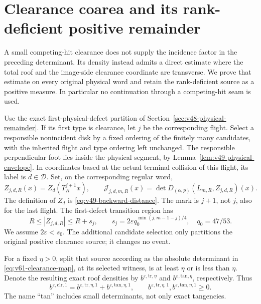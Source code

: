\section{Clearance coarea and its rank-deficient positive remainder}
\label{sec:v61-clearance-coarea}
A small competing-hit clearance does not supply the incidence factor
in the preceding determinant. Its density instead admits a direct
estimate where the total roof and the image-side clearance coordinate
are transverse. We prove that estimate on every original physical word
and retain the rank-deficient source as a positive measure. In
particular no continuation through a competing-hit seam is used.

Use the exact first-physical-defect partition of
Section~\ref{sec:v48-physical-remainder}. If its first type is clearance,
let $j$ be the corresponding flight. Select a responsible nonincident
disk by a fixed ordering of the finitely many candidates, with the
inherited flight and type ordering left unchanged. The responsible
perpendicular foot lies inside the physical segment, by
Lemma~\ref{lem:v49-physical-envelope}. In coordinates based at the
actual terminal collision of this flight, its label is $d\in\mathcal D$.
Set, on the corresponding regular word,
\begin{equation}\label{eq:v61-clearance-map}
 Z_{j,d,R}(x)=Z_d(T_R^{j+1}x),\qquad
 \mathcal J_{j,d,m,R}(x)
   =\det D_{(\alpha,p)}(L_{m,R},Z_{j,d,R})(x).
\end{equation}
The definition of $Z_d$ is \eqref{eq:v49-backward-distance}. The
mark is $j+1$, not $j$, also for the last flight. The first-defect
transition region has
\[
 R\le |Z_{j,d,R}|\le R+s_j,\qquad
 s_j=2\varepsilon q_0^{\min(j,m-1-j)/4},\quad q_0=47/53.
\]
We assume $2\varepsilon<s_0$. The additional candidate selection only
partitions the original positive clearance source; it changes no event.

For a fixed $\eta>0$, split that source according as the absolute
determinant in \eqref{eq:v61-clearance-map}, at its selected witness,
is at least $\eta$ or is less than $\eta$. Denote the resulting exact
roof densities by $b^{\varepsilon,\mathrm{tr},\eta}$ and
$b^{\varepsilon,\mathrm{tan},\eta}$, respectively. Thus
\begin{equation}\label{eq:v61-clearance-positive-split}
 b^{\varepsilon,\mathrm{clr},1}
     =b^{\varepsilon,\mathrm{tr},\eta,1}
                  +b^{\varepsilon,\mathrm{tan},\eta,1},
 \qquad b^{\varepsilon,\mathrm{tr},\eta,1},
        b^{\varepsilon,\mathrm{tan},\eta,1}\ge0.
\end{equation}
The name ``tan'' includes small determinants, not only exact tangencies.

